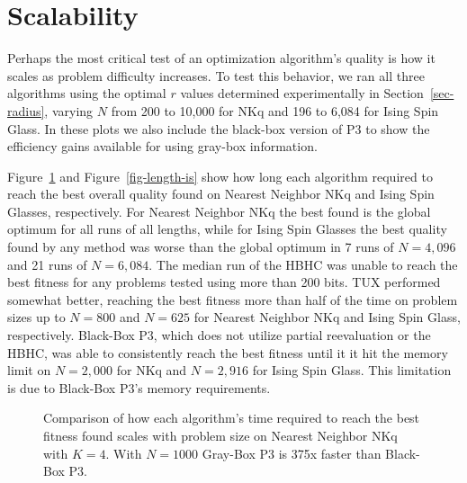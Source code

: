 \begin{figure*}
  \centering
  \caption{Comparison of Gray-Box P3's solution quality during optimization on a log-log scale for different $r$ values.
  For NKq-Landscapes $N=6,000$ and $K=4$ and for Ising Spin Glasses $N=6,084$.}
  \label{fig-radius-over}
\end{figure*}

\section{Scalability}
Perhaps the most critical test of an optimization algorithm's quality is
how it scales as problem difficulty increases. To test this behavior,
we ran all three algorithms using the optimal $r$ values determined experimentally in Section~\ref{sec-radius},
varying $N$ from 200 to 10,000 for NKq and 196 to 6,084 for Ising Spin Glass.
In these plots we also include the black-box version of P3 to show the efficiency
gains available for using gray-box information.


Figure~\ref{fig-length-nn} and Figure~\ref{fig-length-is} show how long each
algorithm required to reach the best overall quality found on Nearest Neighbor NKq
and Ising Spin Glasses, respectively. For Nearest Neighbor NKq the best found
is the global optimum for all runs of all lengths, while for Ising Spin Glasses
the best quality found by any method was worse than the global optimum in 7 runs of
$N=4,096$ and 21 runs of $N=6,084$. The median run of the HBHC was unable to reach the best fitness
for any problems tested using more than 200 bits. TUX performed somewhat better, reaching
the best fitness more than half of the time on problem sizes up to $N=800$ and $N=625$ for Nearest Neighbor NKq and Ising
Spin Glass, respectively. Black-Box P3, which does not utilize partial reevaluation or the HBHC,
was able to consistently reach the best fitness until it it hit the memory limit on $N=2,000$ for
NKq and $N=2,916$ for Ising Spin Glass. This limitation is due to Black-Box P3's
 memory requirements.

\begin{figure}
  \centering
  \caption{Comparison of how each algorithm's time required to reach the best fitness found scales with problem size
  on Nearest Neighbor NKq with $K=4$. With $N=1000$ Gray-Box P3 is 375x faster than Black-Box P3.}
  \label{fig-length-nn}
\end{figure}

